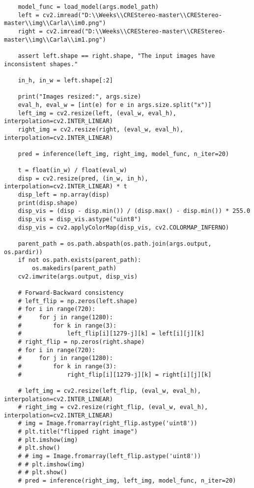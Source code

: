 \begin{verbatim}
    model_func = load_model(args.model_path)
    left = cv2.imread("D:\\Weeks\\CREStereo-master\\CREStereo-master\\img\\Carla\\im0.png")
    right = cv2.imread("D:\\Weeks\\CREStereo-master\\CREStereo-master\\img\\Carla\\im1.png")

    assert left.shape == right.shape, "The input images have inconsistent shapes."

    in_h, in_w = left.shape[:2]

    print("Images resized:", args.size)
    eval_h, eval_w = [int(e) for e in args.size.split("x")]
    left_img = cv2.resize(left, (eval_w, eval_h), interpolation=cv2.INTER_LINEAR)
    right_img = cv2.resize(right, (eval_w, eval_h), interpolation=cv2.INTER_LINEAR)

    pred = inference(left_img, right_img, model_func, n_iter=20)

    t = float(in_w) / float(eval_w)
    disp = cv2.resize(pred, (in_w, in_h), interpolation=cv2.INTER_LINEAR) * t
    disp_left = np.array(disp)
    print(disp.shape)
    disp_vis = (disp - disp.min()) / (disp.max() - disp.min()) * 255.0
    disp_vis = disp_vis.astype("uint8")
    disp_vis = cv2.applyColorMap(disp_vis, cv2.COLORMAP_INFERNO)

    parent_path = os.path.abspath(os.path.join(args.output, os.pardir))
    if not os.path.exists(parent_path):
        os.makedirs(parent_path)
    cv2.imwrite(args.output, disp_vis)

    # Forward-Backward consistency
    # left_flip = np.zeros(left.shape)
    # for i in range(720):
    #     for j in range(1280):
    #         for k in range(3):
    #             left_flip[i][1279-j][k] = left[i][j][k]
    # right_flip = np.zeros(right.shape)
    # for i in range(720):
    #     for j in range(1280):
    #         for k in range(3):
    #             right_flip[i][1279-j][k] = right[i][j][k]

    # left_img = cv2.resize(left_flip, (eval_w, eval_h), interpolation=cv2.INTER_LINEAR)
    # right_img = cv2.resize(right_flip, (eval_w, eval_h), interpolation=cv2.INTER_LINEAR)
    # img = Image.fromarray(right_flip.astype('uint8'))
    # plt.title("flipped right image")
    # plt.imshow(img)
    # plt.show()
    # # img = Image.fromarray(left_flip.astype('uint8'))
    # # plt.imshow(img)
    # # plt.show()
    # pred = inference(right_img, left_img, model_func, n_iter=20)


\end{verbatim}
